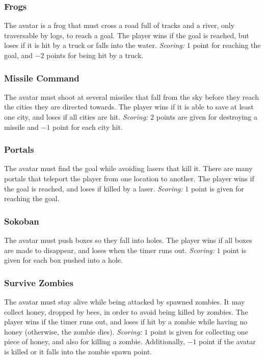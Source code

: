 \documentclass[conference]{IEEEtran}
\begin{document}
\subsubsection{Frogs} The avatar is a frog that must cross a road full of tracks and a river, only traversable by logs, to reach a goal.  The player wins if the goal is reached, but loses if it is hit by a truck or falls into the water. \textit{Scoring:}  $1$ point for reaching the goal, and $-2$ points for being hit by a truck.

\subsubsection{Missile Command} The avatar must shoot at several missiles that fall from the sky before they reach the cities they are directed towards. The player wins if it is able to save at least one city, and loses if all cities are hit. \textit{Scoring:} $2$ points are given for destroying a missile and $-1$ point for each city hit.

\subsubsection{Portals} The avatar must find the goal while avoiding lasers that kill it. There are many portals that teleport the player from one location to another. The player wins if the goal is reached, and loses if killed by a laser.        
 \textit{Scoring:} $1$ point is given for reaching the goal. 

\subsubsection{Sokoban} The avatar must push boxes so they fall into holes. The player wins if all boxes are made to disappear, and loses when the timer runs out. \textit{Scoring:} $1$ point is given for each box pushed into a hole. 

\subsubsection{Survive Zombies} The avatar must stay alive while being attacked by spawned zombies. It may collect honey, dropped by bees, in order to avoid being killed by zombies. The player wins if the timer runs out, and loses if hit by a zombie while having no honey (otherwise, the zombie dies). \textit{Scoring:} $1$ point is given for collecting one piece of honey, and also for killing a zombie. Additionally, $-1$ point if the avatar is killed or it falls into the zombie spawn point.
\end{document}

